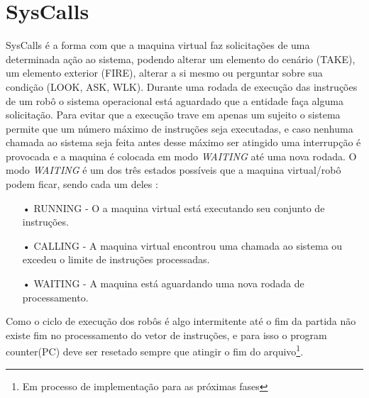 \documentclass[a4paper]{article}
\begin{document}
\section{SysCalls}
SysCalls é a forma com que a maquina virtual faz solicitações de uma determinada ação ao sistema, podendo alterar um elemento do cenário (TAKE), um elemento exterior (FIRE), alterar a si mesmo ou perguntar sobre sua condição (LOOK, ASK, WLK). Durante uma rodada de execução das instruções de um robô o sistema operacional está aguardado que a entidade faça alguma solicitação. Para evitar que a execução trave em apenas um sujeito o sistema permite que um número máximo de instruções seja executadas, e caso nenhuma chamada ao sistema seja feita antes desse máximo ser atingido uma interrupção é provocada e a maquina é colocada em modo \textit{WAITING} até uma nova rodada. O modo \textit{WAITING} é um dos três estados possíveis que a maquina virtual/robô podem ficar, sendo cada um deles :
\begin{itemize}
\item[•]{RUNNING - O a maquina virtual está executando seu conjunto de instruções.}
\item[•]{CALLING - A maquina virtual encontrou uma chamada ao sistema ou excedeu o limite de instruções processadas.}
\item[•]{WAITING - A maquina está aguardando uma nova rodada de processamento.}
\end{itemize}
Como o ciclo de execução dos robôs é algo intermitente até o fim da partida não existe fim no processamento do vetor de instruções, e para isso o program counter(PC) deve ser resetado sempre que atingir o fim do arquivo\footnote{Em processo de implementação para as próximas fases}.
\end{document}
